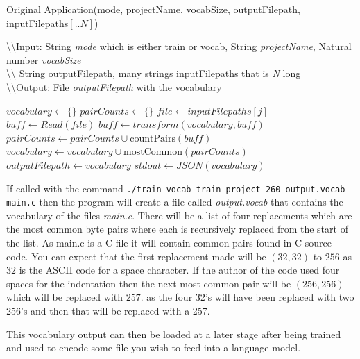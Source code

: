 \documentclass{article}
\begin{document}
\begin{algorithm}[H]
    \caption{Original Application(mode, projectName, vocabSize, outputFilepath, inputFilepaths$[..N]$)} \label{alg:original}
    \textbackslash \textbackslash Input: String \textit{mode} which is either train or vocab, String \textit{projectName}, Natural number \textit{vocabSize}\\
    \textbackslash \textbackslash \hspace{1cm} String outputFilepath, many strings inputFilepaths that is \textit{N} long \\
    \textbackslash \textbackslash Output: File \textit{outputFilepath} with the vocabulary 
    \begin{algorithmic}[1]
        \State $vocabulary \gets \{\}$
                \State $pairCounts \gets \{\}$
                    \State $file \gets inputFilepaths[j]$
                    \State $buff \gets Read(file)$
                    \State $buff \gets transform(vocabulary, buff)$ 
                    \State $pairCounts \gets pairCounts \cup \text{countPairs}(buff)$
                \EndFor
                \State $vocabulary \gets vocabulary \cup \text{mostCommon}(pairCounts)$
                \State $outputFilepath \gets vocabulary$
            \EndFor
            \State $stdout \gets JSON(vocabulary)$
        \EndIf
    \end{algorithmic}
\end{algorithm}

If called with the command \texttt{./train_vocab train project 260 output.vocab main.c} then the 
program will create a file called \textit{output.vocab} that contains the vocabulary of the files \textit{main.c}.
There will be a list of four replacements which are the most common byte pairs where each is recursively replaced from the 
start of the list. As main.c is a C file it will contain common pairs found in C source code. You can expect that the first replacement made 
will be $(32,32)$ to $256$ as $32$ is the ASCII code for a space character. If the author of the code
used four spaces for the indentation then the next most common pair will be $(256,256)$ which will be replaced with $257$.
 as the four 32's will have been replaced  with two 256's and then that will be replaced with a 257.


This vocabulary output can then be loaded at a later stage after being trained and used to encode 
some file you wish to feed into a language model.
\end{document}

